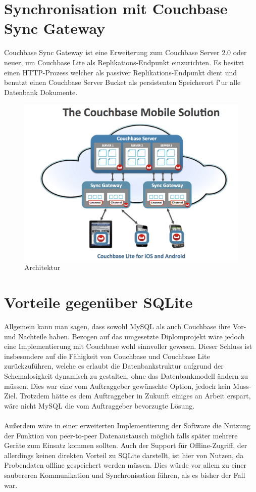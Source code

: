 \documentclass[a4paper,14pt]{scrreprt}
\begin{document}
\section{Synchronisation mit Couchbase Sync Gateway}
Couchbase Sync Gateway ist eine Erweiterung zum Couchbase Server 2.0 oder neuer, um Couchbase Lite als Replikations-Endpunkt einzurichten. Es besitzt einen HTTP-Prozess welcher als passiver Replikations-Endpunkt dient und benutzt einen Couchbase Server Bucket als persistenten Speicherort f"ur alle Datenbank Dokumente.\cite{sync1}
\begin{figure}[h!]
\centering
\includegraphics[width=1\linewidth]{./mobile-solution}
\caption[Architektur]{Architektur}
\label{fig:mobile-solution}
\end{figure}
\section{Vorteile gegenüber SQLite}
Allgemein kann man sagen, dass sowohl MySQL als auch Couchbase ihre Vor- und Nachteile haben. Bezogen auf das umgesetzte Diplomprojekt wäre jedoch eine Implementierung mit Couchbase wohl sinnvoller gewesen. Dieser Schluss ist insbesondere auf die Fähigkeit von Couchbase und Couchbase Lite zurückzuführen, welche es erlaubt die Datenbankstruktur aufgrund der Schemalosigkeit dynamisch zu gestalten, ohne das Datenbankmodell ändern zu müssen. Dies war eine vom Auftraggeber gewünschte Option, jedoch kein Muss-Ziel. Trotzdem hätte es dem Auftraggeber in Zukunft einiges an Arbeit erspart, wäre nicht MySQL die vom Auftraggeber bevorzugte Lösung.\\\\Außerdem wäre in einer erweiterten Implementierung der Software die Nutzung der Funktion von peer-to-peer Datenaustausch möglich falls später mehrere Geräte zum Einsatz kommen sollten. Auch der Support für Offline-Zugriff, der allerdings keinen direkten Vorteil zu SQLite darstellt, ist hier von Nutzen, da Probendaten offline gespeichert werden müssen. Dies würde vor allem zu einer saubereren Kommunikation und Synchronisation führen, als es bisher der Fall war.

\end{document}
